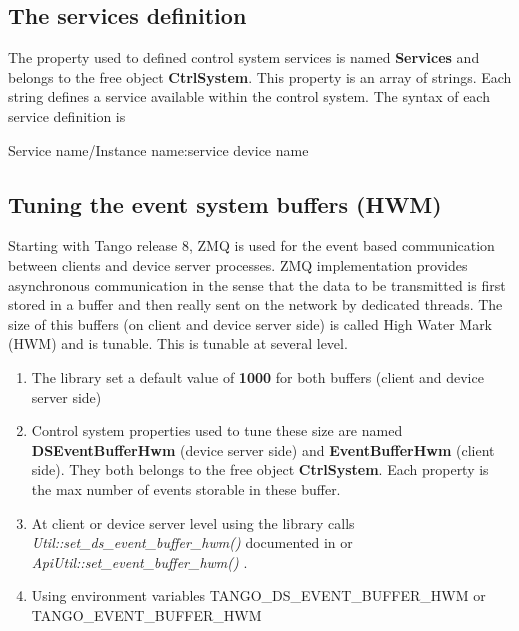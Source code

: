 \subsection{The services definition}

The property used to defined control system services is named \textbf{Services}
and belongs to the free object \textbf{CtrlSystem}.
This property is an array of strings. Each string defines a service
available within the control system. The syntax of each service definition
is \begin{center}Service name/Instance name:service device name\end{center}


\subsection{Tuning the event system buffers (HWM)}

Starting with Tango release 8, ZMQ is used for the event
based communication between clients and device server processes. ZMQ
implementation provides asynchronous communication in the sense that
the data to be transmitted is first stored in a buffer and then really
sent on the network by dedicated threads. The size of this buffers
(on client and device server side) is called High Water Mark (HWM)
and is tunable. This is tunable at several level.
\begin{enumerate}
\item The library set a default value of \textbf{1000} for both buffers
(client and device server side)
\item Control system properties used to tune these size are named \textbf{DSEventBufferHwm}
(device server side) and \textbf{EventBufferHwm}
(client side). They both belongs to the free object \textbf{CtrlSystem}.
Each property is the max number of events storable in these buffer.
\item At client or device server level using the library calls \emph{Util::set\_ds\_event\_buffer\_hwm()}
documented in \cite{Tango-dsclasses-doc} or \emph{ApiUtil::set\_event\_buffer\_hwm()
}.
\item Using environment variables TANGO\_DS\_EVENT\_BUFFER\_HWM
or TANGO\_EVENT\_BUFFER\_HWM
\end{enumerate}

